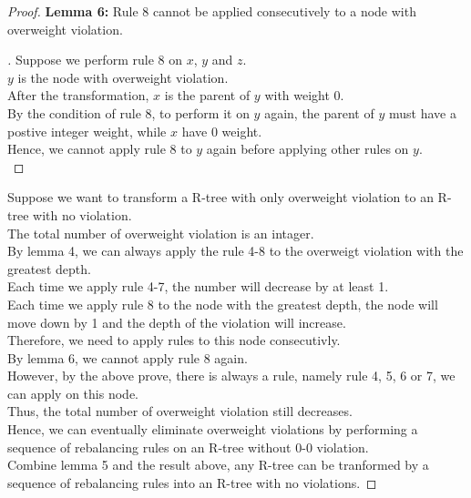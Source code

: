 \documentclass[10pt]{article}
\newenvironment{subproof}[1][\proofname]{%
	\renewcommand{\qedsymbol}{$\blacksquare$}%
	\begin{proof}[#1]%
}{%
	\end{proof}%
}
\begin{document}
\begin{enumerate}
\begin{proof}
	\textbf{Lemma 6:} Rule 8 cannot be applied consecutively to a node
	with overweight violation.
	\begin{subproof}
		Suppose we perform rule 8 on $x$, $y$ and $z$. \\
		$y$ is the node with overweight violation. \\
		After the transformation, $x$ is the parent of $y$ with weight 0. \\
		By the condition of rule 8, to perform it on $y$ again, the parent of
		$y$ must have a postive integer weight, while $x$ have 0 weight. \\
		Hence, we cannot apply rule 8 to $y$ again before applying other rules
		on $y$. \\
	\end{subproof}

	Suppose we want to transform a R-tree with only overweight violation to an
	R-tree with no violation. \\
	The total number of overweight violation is an intager. \\
	By lemma 4, we can always apply the rule 4-8 to the overweigt violation
	with the greatest depth. \\
	Each time we apply rule 4-7, the number will decrease by at least 1. \\
	Each time we apply rule 8 to the node with the greatest depth, the node
	will move down by 1 and the depth of the violation will increase. \\
	Therefore, we need to apply rules to this node consecutivly. \\
	By lemma 6, we cannot apply rule 8 again. \\
	However, by the above prove, there is always a rule, namely rule 4, 5, 6 or
	7, we can apply on this node. \\
	Thus, the total number of overweight violation still decreases. \\
	Hence, we can eventually eliminate overweight violations by performing a
	sequence of rebalancing rules on an R-tree without 0-0 violation. \\

	Combine lemma 5 and the result above, any R-tree can be tranformed by a
	sequence of rebalancing rules into an R-tree with no violations.

	\end{proof}


\end{enumerate}
\end{document}
